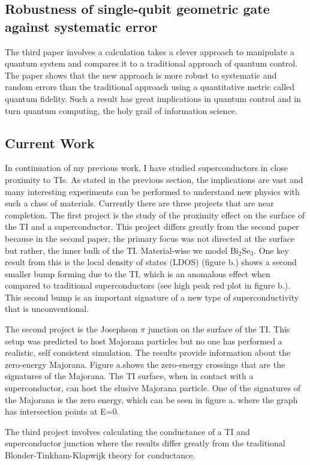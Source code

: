 \documentclass[12pt,twocolumn]{article}
\begin{document}
\subsection*{Robustness of single-qubit geometric gate against systematic error}
The third paper involves a calculation takes a clever approach to manipulate a quantum system and compares it to a traditional approach of quantum control. The paper shows that the new approach is more robust to systematic and random errors than the traditional approach using a quantitative metric called quantum fidelity. Such a result has great implications in quantum control and in turn quantum computing, the holy grail of information science.

\subsection*{Current Work}
In continuation of my previous work, I have studied superconductors in close proximity to TIs. As stated in the previous section, the implications are vast and many interesting experiments can be performed to understand new physics with such a class of materials. Currently there are three projects that are near completion. The first project is the study of the proximity effect on the surface of the TI and a superconductor. This project differs greatly from the second paper because in the second paper, the primary focus was not directed at the surface but rather, the inner bulk of the TI. Material-wise we model Bi$_2$Se$_3$. One key result from this is the local density of states (LDOS) (figure b.) shows a second smaller bump forming due to the TI, which is an anomalous effect when compared to traditional superconductors (see high peak red plot in figure b.). This second bump is an important signature of a new type of superconductivity that is unconventional. 

The second project is the Josephson $\pi$ junction on the surface of the TI. This setup was predicted to host Majorana particles but no one has performed a realistic, self consistent simulation. The results provide information about the zero-energy Majorana. Figure a.shows the zero-energy crossings that are the signatures of the Majorana. The TI surface, when in contact with a superconductor, can host the elusive Majorana particle. One of the signatures of the Majorana is the zero energy, which can be seen in figure a. where the graph has intersection points at E=0. 


The third project involves calculating the conductance of a TI  and superconductor junction where the results differ greatly from the traditional Blonder-Tinkham-Klapwijk theory for conductance. 
\end{document}
